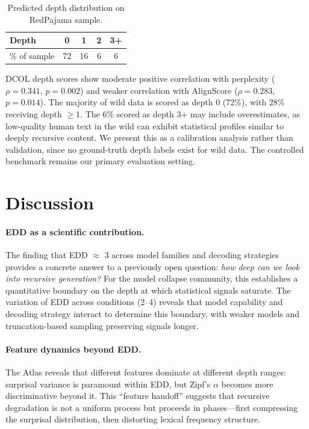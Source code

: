 \documentclass[11pt,a4paper]{article}
\begin{document}
\begin{table}[t]
\centering
\small
\caption{Predicted depth distribution on RedPajama sample.}
\label{tab:wild}
\begin{tabular}{@{}lcccc@{}}
\toprule
\textbf{Depth} & 0 & 1 & 2 & 3+ \\
\midrule
\% of sample & 72 & 16 & 6 & 6 \\
\bottomrule
\end{tabular}
\end{table}

DCOL depth scores show moderate positive correlation with perplexity ($\rho = 0.341$, $p = 0.002$) and weaker correlation with AlignScore ($\rho = 0.283$, $p = 0.014$).
The majority of wild data is scored as depth 0 (72\%), with 28\% receiving depth $\geq$1.
The 6\% scored as depth 3+ may include overestimates, as low-quality human text in the wild can exhibit statistical profiles similar to deeply recursive content.
We present this as a calibration analysis rather than validation, since no ground-truth depth labels exist for wild data.
The controlled benchmark remains our primary evaluation setting.

\section{Discussion}
\label{sec:discussion}

\paragraph{EDD as a scientific contribution.}
The finding that EDD $\approx$ 3 across model families and decoding strategies provides a concrete answer to a previously open question: \emph{how deep can we look into recursive generation?}
For the model collapse community, this establishes a quantitative boundary on the depth at which statistical signals saturate.
The variation of EDD across conditions (2--4) reveals that model capability and decoding strategy interact to determine this boundary, with weaker models and truncation-based sampling preserving signals longer.

\paragraph{Feature dynamics beyond EDD.}
The Atlas reveals that different features dominate at different depth ranges: surprisal variance is paramount within EDD, but Zipf's $\alpha$ becomes more discriminative beyond it.
This ``feature handoff'' suggests that recursive degradation is not a uniform process but proceeds in phases---first compressing the surprisal distribution, then distorting lexical frequency structure.
\end{document}
